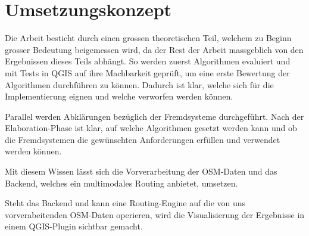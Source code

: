 \section{Umsetzungskonzept}
\label{sec:Umsetzungskonzept}

Die Arbeit besticht durch einen grossen theoretischen Teil, welchem zu Beginn grosser Bedeutung beigemessen wird, da der Rest der Arbeit massgeblich von den Ergebnissen dieses Teils abhängt. So werden zuerst Algorithmen evaluiert und mit Tests in QGIS auf ihre Machbarkeit geprüft, um eine erste Bewertung der Algorithmen durchführen zu können. Dadurch ist klar, welche sich für die Implementierung eignen und welche verworfen werden können.

Parallel werden Abklärungen bezüglich der Fremdsysteme durchgeführt. Nach der Elaboration-Phase ist klar, auf welche Algorithmen gesetzt werden kann und ob die Fremdsystemen die gewünschten Anforderungen erfüllen und verwendet werden können.

Mit diesem Wissen lässt sich die Vorverarbeitung der \ac{OSM}-Daten und das Backend, welches ein multimodales Routing anbietet, umsetzen.

Steht das Backend und kann eine Routing-Engine auf die von uns vorverabeitenden \ac{OSM}-Daten operieren, wird die Visualisierung der Ergebnisse in einem QGIS-Plugin sichtbar gemacht.
